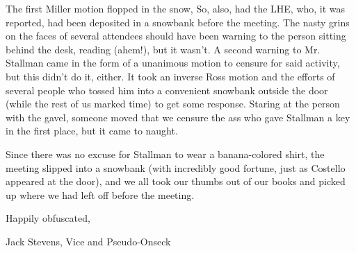 \documentclass[12pt]{article}
\begin{document}
The first Miller motion flopped in the snow, So, also, had the LHE, who, it was reported, had been deposited in a snowbank before the meeting. The nasty grins on the faces of several attendees should have been warning to the person sitting behind the desk, reading (ahem!), but it wasn't. A second warning to Mr. Stallman came in the form of a unanimous motion to censure for said activity, but this didn't do it, either. It took an inverse Ross motion and the efforts of several people who tossed him into a convenient snowbank outside the door (while the rest of us marked time) to get some response. Staring at the person with the gavel, someone moved that we censure the ass who gave Stallman a key in the first place, but it came to naught.

Since there was no excuse for Stallman to wear a banana-colored shirt, the meeting slipped into a snowbank (with incredibly good fortune, just as Costello appeared at the door), and we all took our thumbs out of our books and picked up where we had left off before the meeting.

\vspace{12pt}

\centerline{Happily obfuscated,}
\centerline{Jack Stevens, Vice and Pseudo-Onseck}
\end{document}
